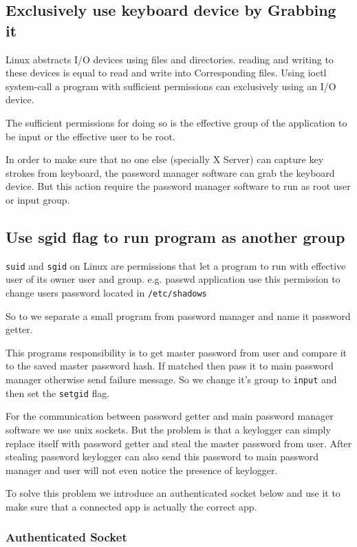 \documentclass[journal]{IEEEtran}
\begin{document}
\subsection{Exclusively use keyboard device by Grabbing it}

Linux abstracts I/O devices using files and directories. reading and writing to these devices is equal to read and write into Corresponding files. Using ioctl system-call a program with sufficient permissions can exclusively using an I/O device. 

The sufficient permissions for doing so is the effective group of the application to be input or the effective user to be root.

In order to make sure that no one else (specially X Server) can capture key strokes from keyboard, the password manager software can grab the keyboard device. But this action require the password manager software to run as root user or input group. 

\subsection{Use sgid flag to run program as another group}

\texttt{suid} and \texttt{sgid} on Linux are permissions that let a program to run with effective user of its owner user and group. e.g. passwd application use this permission to change users password located in \texttt{/etc/shadows}

So to  we separate a small program from password manager and name it password getter. 

This programs responsibility is to get master password from user and compare it to the saved master password hash. If matched then pass it to main password manager otherwise send failure message. So we change it's group to \texttt{input} and then set the \texttt{setgid} flag. 

For the communication between password getter and main password manager software we use unix sockets. But the problem is that a keylogger can simply replace itself with password getter and steal the master password from user. After stealing password keylogger can also send this password to main password manager and user will not even notice the presence of keylogger.

To solve this problem we introduce an authenticated socket below and use it to make sure that a connected app is actually the correct app.

\subsubsection{Authenticated Socket}
\label{authentic}
\end{document}
